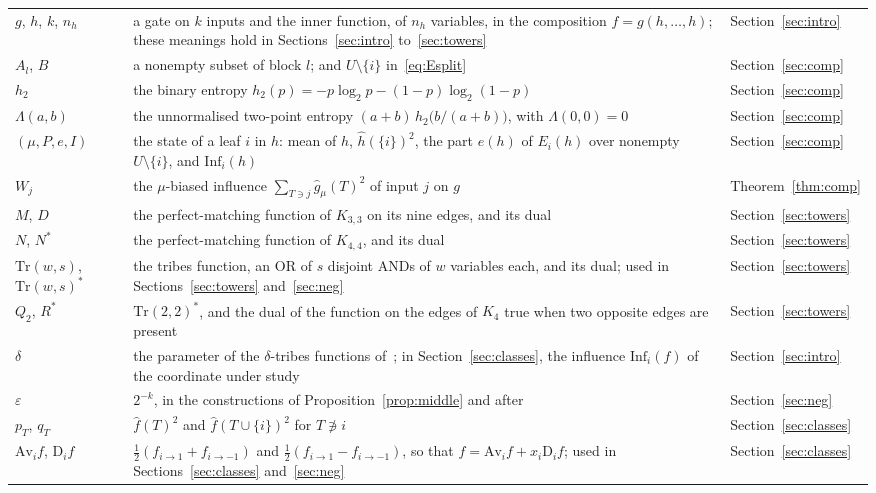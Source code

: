 \documentclass[11pt]{amsart}
\theoremstyle{definition}
\theoremstyle{remark}
\newcommand{\Inf}{\mathrm{Inf}}
\begin{document}
\begin{longtable}{@{}>{\raggedright\arraybackslash}p{}>{\raggedright\arraybackslash}p{}>{\raggedright\arraybackslash}p{}@{}}
$g$, $h$, $k$, $n_h$ & a gate on $k$ inputs and the inner function, of $n_h$ variables, in the composition $f=g(h,\dots,h)$; these meanings hold in Sections~\ref{sec:intro} to~\ref{sec:towers} & Section~\ref{sec:intro} \\
$A_l$, $B$ & a nonempty subset of block $l$; and $U\setminus\{i\}$ in~\eqref{eq:Esplit} & Section~\ref{sec:comp} \\
$h_2$ & the binary entropy $h_2(p)=-p\log_2p-(1-p)\log_2(1-p)$ & Section~\ref{sec:comp} \\
$\Lambda(a,b)$ & the unnormalised two-point entropy $(a+b)\,h_2\bigl(b/(a+b)\bigr)$, with $\Lambda(0,0)=0$ & Section~\ref{sec:comp} \\
$(\mu,P,e,I)$ & the state of a leaf $i$ in $h$: mean of $h$, $\hat h(\{i\})^2$, the part $e(h)$ of $E_i(h)$ over nonempty $U\setminus\{i\}$, and $\Inf_i(h)$ & Section~\ref{sec:comp} \\
$W_j$ & the $\mu$-biased influence $\sum_{T\ni j}\hat g_\mu(T)^2$ of input $j$ on $g$ & Theorem~\ref{thm:comp} \\
$M$, $D$ & the perfect-matching function of $K_{3,3}$ on its nine edges, and its dual & Section~\ref{sec:towers} \\
$N$, $N^\ast$ & the perfect-matching function of $K_{4,4}$, and its dual & Section~\ref{sec:towers} \\
$\mathrm{Tr}(w,s)$, $\mathrm{Tr}(w,s)^\ast$ & the tribes function, an OR of $s$ disjoint ANDs of $w$ variables each, and its dual; used in Sections~\ref{sec:towers} and~\ref{sec:neg} & Section~\ref{sec:towers} \\
$Q_2$, $R^\ast$ & $\mathrm{Tr}(2,2)^\ast$, and the dual of the function on the edges of $K_4$ true when two opposite edges are present & Section~\ref{sec:towers} \\
$\delta$ & the parameter of the $\delta$-tribes functions of~\cite{GMP}; in Section~\ref{sec:classes}, the influence $\Inf_i(f)$ of the coordinate under study & Section~\ref{sec:intro} \\
$\varepsilon$ & $2^{-k}$, in the constructions of Proposition~\ref{prop:middle} and after & Section~\ref{sec:neg} \\
$p_T$, $q_T$ & $\hat f(T)^2$ and $\hat f(T\cup\{i\})^2$ for $T\not\ni i$ & Section~\ref{sec:classes} \\
$\mathrm{Av}_if$, $\mathrm D_if$ & $\tfrac12(f_{i\to1}+f_{i\to-1})$ and $\tfrac12(f_{i\to1}-f_{i\to-1})$, so that $f=\mathrm{Av}_if+x_i\mathrm D_if$; used in Sections~\ref{sec:classes} and~\ref{sec:neg} & Section~\ref{sec:classes} \\

\end{longtable}
\end{document}

